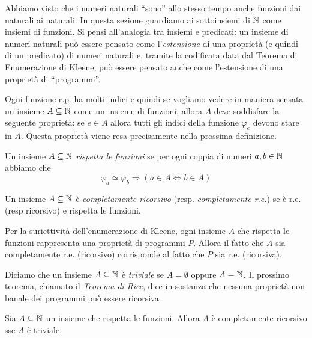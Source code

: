\documentclass[runningheads,a4paper]{llncs}
\begin{document}
Abbiamo visto che i numeri naturali ``sono'' allo stesso tempo anche funzioni dai naturali ai naturali. In questa sezione
 guardiamo ai sottoinsiemi di $\mathbb{N}$ come insiemi di funzioni. Si pensi all'analogia tra insiemi e predicati: un insieme di numeri naturali
 pu\`{o} essere pensato come l'\emph{estensione} di una propriet\`{a} (e quindi di un predicato) di numeri naturali e, tramite la codificata 
 data dal Teorema di Enumerazione di Kleene, pu\`{o} essere pensato anche come l'estensione di una propriet\`{a} di ``programmi''.

Ogni funzione r.p. ha molti indici e quindi se vogliamo vedere in maniera sensata un insieme $A \subseteq \mathbb{N}$ come un 
 insieme di funzioni, allora $A$ deve soddisfare la seguente propriet\`{a}: se $e \in A$ allora tutti gli indici della funzione
 $\varphi_e$ devono stare in $A$. Questa propriet\`{a} viene resa precisamente nella prossima definizione.

\begin{definition}\label{def:risp-fun}
Un insieme $A\subseteq \mathbb{N}$ \emph{rispetta le funzioni} se per ogni coppia di numeri $a,b \in\mathbb{N}$ abbiamo che 
$$ \varphi_a \simeq \varphi_b \Rightarrow (a \in A \iff b \in A) $$
\end{definition}

\begin{definition}\label{def:compl-re}
Un insieme $A\subseteq \mathbb{N}$ \`{e} \emph{completamente ricorsivo} (resp. \emph{completamente r.e.}) se \`{e} r.e. (resp ricorsivo)
 e rispetta le funzioni.
\end{definition}

Per la suriettivit\`{a} dell'enumerazione di Kleene, ogni insieme $A$ che rispetta le funzioni rappresenta una propriet\`{a} di 
 programmi $P$. Allora il fatto che $A$ sia completamente r.e. (ricorsivo) corrisponde al fatto che $P$ sia r.e. (ricorsiva).

Diciamo che un insieme $A\subseteq \mathbb{N}$ \`{e} \emph{triviale} se $A = \emptyset$ oppure $A = \mathbb{N}$. Il prossimo teorema,
 chiamato il \emph{Teorema di Rice}, dice in sostanza che nessuna propriet\`{a} non banale dei programmi pu\`{o} essere
 ricorsiva.

\begin{theorem}[di Rice]\label{thm:rice}
Sia $A \subseteq \mathbb{N}$ un insieme che rispetta le funzioni. Allora $A$ \`{e} completamente ricorsivo sse $A$ \`{e} triviale.
\end{theorem}
\end{document}

